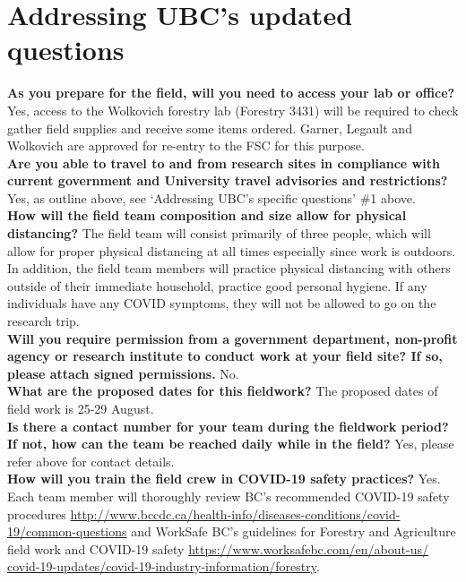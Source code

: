\documentclass[11pt,letter]{article}
\begin{document}
\section{Addressing UBC's updated questions}
\textbf{As you prepare for the field, will you need to access your lab or office?}
Yes, access to the Wolkovich forestry lab (Forestry 3431) will be required to check gather field supplies and receive some items ordered. Garner, Legault and Wolkovich are approved for re-entry to the FSC for this purpose. \\

\textbf{Are you able to travel to and from research sites in compliance with current government and University travel advisories and restrictions?}
Yes, as outline above, see `Addressing UBC's specific questions' \#1 above.\\

\textbf{How will the field team composition and size allow for physical distancing?}
The field team will consist primarily of three people, which will allow for proper physical distancing at all times especially since work is outdoors. In addition, the field team members will practice physical distancing with others outside of their immediate household, practice good personal hygiene. If any individuals have any COVID symptoms, they will not be allowed to go on the research trip. \\

\textbf{Will you require permission from a government department, non-profit agency or research institute to conduct work at your field site?  If so, please attach signed permissions.} 
No. \\ 

\textbf{What are the proposed dates for this fieldwork?}
The proposed dates of field work is 25-29 August.\\

\textbf{Is there a contact number for your team during the fieldwork period?  If not, how can the team be reached daily while in the field?} Yes, please refer above for contact details.\\

\textbf{How will you train the field crew in COVID-19 safety practices?} 
Yes. Each team member will thoroughly review BC's recommended COVID-19 safety procedures \url{http://www.bccdc.ca/health-info/diseases-conditions/covid-19/common-questions} and WorkSafe BC's guidelines for Forestry and Agriculture field work and COVID-19 safety \url{https://www.worksafebc.com/en/about-us/
covid-19-updates/covid-19-industry-information/forestry}. \\
\end{document}
